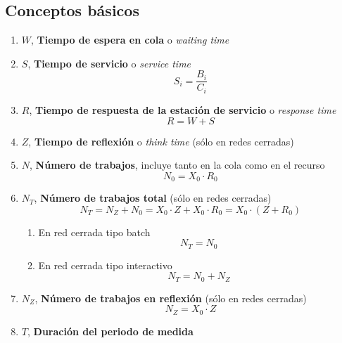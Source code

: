 \documentclass[10pt,spanish, landscape, twocolumn]{article}
\begin{document}
\subsection{Conceptos básicos}
\begin{enumerate}[$\bullet$]
    \item $W$, \textbf{Tiempo de espera en cola} o \textit{waiting time}
    \item $S$, \textbf{Tiempo de servicio} o \textit{service time}
    \begin{displaymath}
        S_i = \frac{B_i}{C_i}
    \end{displaymath}
    \item $R$, \textbf{Tiempo de respuesta de la estación de servicio} o \textit{response time}
    \begin{displaymath}
        R = W + S     
    \end{displaymath}
    \item $Z$, \textbf{Tiempo de reflexión} o \textit{think time} (sólo en redes cerradas)
    \item $N$, \textbf{Número de trabajos}, incluye tanto en la cola como en el recurso
    \begin{displaymath}
        N_0 = X_0 \cdot R_0
    \end{displaymath}
    \item $N_T$, \textbf{Número de trabajos total} (sólo en redes cerradas)
    \begin{displaymath}
        N_T = N_Z + N_0 = X_0 \cdot Z + X_0 \cdot R_0 = X_0 \cdot (Z + R_0)
    \end{displaymath}
    \begin{enumerate}[$\longrightarrow$]
        \item En red cerrada tipo batch
        \begin{displaymath}
            N_T = N_0
        \end{displaymath}
        \item En red cerrada tipo interactivo
        \begin{displaymath}
            N_T = N_0 + N_Z
        \end{displaymath}
    \end{enumerate}
    \item $N_Z$, \textbf{Número de trabajos en reflexión} (sólo en redes cerradas)
    \begin{displaymath}
        N_Z = X_0 \cdot Z
    \end{displaymath}
    \item $T$, \textbf{Duración del periodo de medida}

\end{enumerate}
\end{document}

